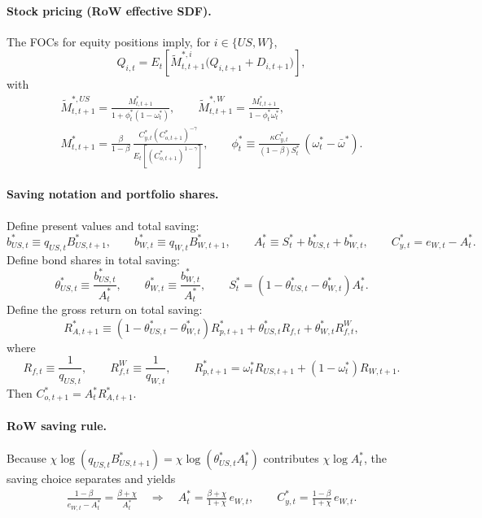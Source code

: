 \documentclass[12pt]{article}
\theoremstyle{plain}
\begin{document}
\paragraph{Stock pricing (RoW effective SDF).}
The FOCs for equity positions imply, for $i\in\{US,W\}$,
\[
Q_{i,t}
=
E_t\!\left[\tilde M^{*,i}_{t,t+1}\bigl(Q_{i,t+1}+D_{i,t+1}\bigr)\right],
\]
with
\begin{align*}
\tilde M^{*,US}_{t,t+1}=\frac{M^*_{t,t+1}}{1+\phi_t^*(1-\omega_t^*)},
\qquad
\tilde M^{*,W}_{t,t+1}=\frac{M^*_{t,t+1}}{1-\phi_t^*\omega_t^*},\\
M^*_{t,t+1}
=\frac{\beta}{1-\beta}\,
\frac{C^*_{y,t}(C^*_{o,t+1})^{-\gamma}}{E_t\!\left[(C^*_{o,t+1})^{1-\gamma}\right]},
\qquad
\phi_t^* \equiv \frac{\kappa C^*_{y,t}}{(1-\beta)S_t^*}\,(\omega_t^*-\bar\omega^*).
\end{align*}

\paragraph{Saving notation and portfolio shares.}
Define present values and total saving:
\[
b_{US,t}^*\equiv q_{US,t}B^*_{US,t+1},
\qquad
b_{W,t}^*\equiv q_{W,t}B^*_{W,t+1},
\qquad
A_t^*\equiv S_t^*+b_{US,t}^*+b_{W,t}^*,
\qquad
C^*_{y,t}=e_{W,t}-A_t^*.
\]
Define bond shares in total saving:
\[
\theta_{US,t}^*\equiv \frac{b_{US,t}^*}{A_t^*},
\qquad
\theta_{W,t}^*\equiv \frac{b_{W,t}^*}{A_t^*},
\qquad
S_t^*=(1-\theta_{US,t}^*-\theta_{W,t}^*)A_t^*.
\]
Define the gross return on total saving:
\[
R_{A,t+1}^*
\equiv
(1-\theta_{US,t}^*-\theta_{W,t}^*)R_{p,t+1}^*
+\theta_{US,t}^* R_{f,t}
+\theta_{W,t}^* R_{f,t}^W,
\]
where
\[
R_{f,t}\equiv \frac{1}{q_{US,t}},
\qquad
R_{f,t}^W\equiv \frac{1}{q_{W,t}},
\qquad
R_{p,t+1}^*=\omega_t^*R_{US,t+1}+(1-\omega_t^*)R_{W,t+1}.
\]
Then $C^*_{o,t+1}=A_t^*R_{A,t+1}^*$.

\paragraph{RoW saving rule.}
Because $\chi\log(q_{US,t}B_{US,t+1}^*)=\chi\log(\theta_{US,t}^*A_t^*)$ contributes $\chi\log A_t^*$,
the saving choice separates and yields
\begin{align}\label{RoW_saving_rule_bond_cost}
\frac{1-\beta}{e_{W,t}-A_t^*}=\frac{\beta+\chi}{A_t^*}
\quad\Rightarrow\quad
A_t^*=\frac{\beta+\chi}{1+\chi}\,e_{W,t},
\qquad
C^*_{y,t}=\frac{1-\beta}{1+\chi}\,e_{W,t}.
\end{align}
\end{document}
